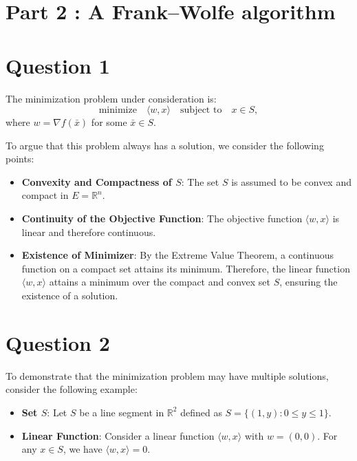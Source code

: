 \documentclass[12p]{article}
\begin{document}
\newpage


\section*{Part 2 : A Frank–Wolfe algorithm} 


\section*{Question 1} 

The minimization problem under consideration is:
\begin{equation}
    \text{minimize} \quad \langle w, x \rangle \quad \text{subject to} \quad x \in S,
\end{equation}
where \( w = \nabla f(\bar{x}) \) for some \( \bar{x} \in S \).

To argue that this problem always has a solution, we consider the following points:

\begin{itemize}
    \item \textbf{Convexity and Compactness of \( S \)}: The set \( S \) is assumed to be convex and compact in \( E = \mathbb{R}^n \).
    \item \textbf{Continuity of the Objective Function}: The objective function \( \langle w, x \rangle \) is linear and therefore continuous.
    \item \textbf{Existence of Minimizer}: By the Extreme Value Theorem, a continuous function on a compact set attains its minimum. Therefore, the linear function \( \langle w, x \rangle \) attains a minimum over the compact and convex set \( S \), ensuring the existence of a solution.
\end{itemize}

\section*{Question 2} 
To demonstrate that the minimization problem may have multiple solutions, consider the following example:

\begin{itemize}
    \item \textbf{Set \( S \)}: Let \( S \) be a line segment in \( \mathbb{R}^2 \) defined as \( S = \{ (1, y) : 0 \leq y \leq 1 \} \).
    \item \textbf{Linear Function}: Consider a linear function \( \langle w, x \rangle \) with \( w = (0, 0) \). For any \( x \in S \), we have \( \langle w, x \rangle = 0 \).
\end{itemize}
\end{document}

